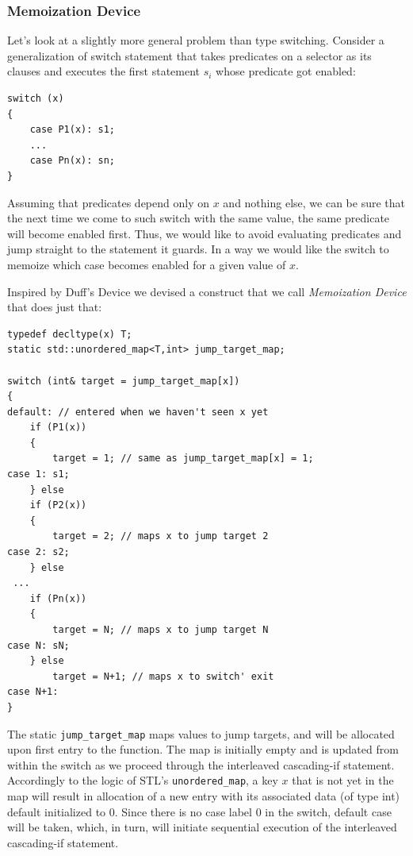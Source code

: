 \documentclass[preprint]{sigplanconf}
\makeatletter
\DeclareRobustCommand{\code}[1]{{\lstinline[breaklines=false,escapechar=@]{#1}}}
\makeatother
\begin{document}
\subsubsection{Memoization Device}
\label{sec:memdev}

Let's look at a slightly more general problem than type switching. Consider a 
generalization of switch statement that takes predicates on a selector as its 
clauses and executes the first statement $s_i$ whose predicate got enabled: 

\begin{lstlisting}
switch (x)
{
    case P1(x): s1;
    ...
    case Pn(x): sn;
}
\end{lstlisting}

\noindent
Assuming that predicates depend only on $x$ and nothing else, we can be sure that
the next time we come to such switch with the same value, the same predicate 
will become enabled first. Thus, we would like to avoid evaluating predicates and 
jump straight to the statement it guards. In a way we would like the switch to 
memoize which case becomes enabled for a given value of $x$. 

Inspired by Duff's Device\cite{Duff} we devised a construct that we call 
\emph{Memoization Device} that does just that:

\begin{lstlisting}
typedef decltype(x) T;
static std::unordered_map<T,int> jump_target_map;

switch (int& target = jump_target_map[x])
{
default: // entered when we haven't seen x yet
    if (P1(x)) 
    {
        target = 1; // same as jump_target_map[x] = 1;
case 1: s1;
    } else 
    if (P2(x)) 
    {
        target = 2; // maps x to jump target 2
case 2: s2;
    } else
 ...
    if (Pn(x)) 
    {
        target = N; // maps x to jump target N
case N: sN;
    } else
        target = N+1; // maps x to switch' exit
case N+1:
}
\end{lstlisting}

The static \code{jump_target_map} maps values to jump targets, and will be 
allocated upon first entry to the function. The map is initially empty and is 
updated from within the switch as we proceed through the interleaved 
cascading-if statement. Accordingly to the logic of STL's \code{unordered_map}, 
a key $x$ that is not yet in the map will result in allocation of a new entry 
with its associated data (of type int) default initialized to 0. Since there is 
no case label 0 in the switch, default case will be taken, which, in turn, will 
initiate sequential execution of the interleaved cascading-if statement.
\end{document}
